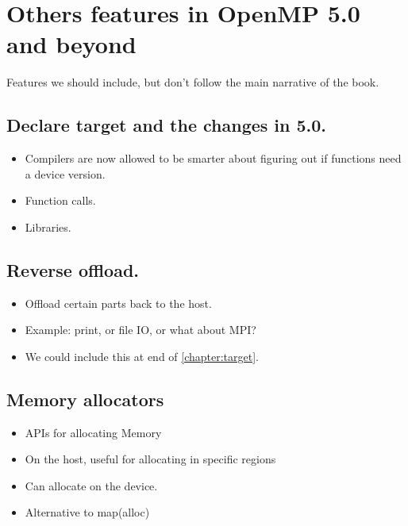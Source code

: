 
\chapter{Others features in OpenMP 5.0 and beyond}
\label{chapter:future}

Features we should include, but don't follow the main narrative of the book.

\section{Declare target and the changes in 5.0.}
\begin{itemize}
    \item Compilers are now allowed to be smarter about figuring out if functions need a device version.
    \item Function calls.
    \item Libraries.
\end{itemize}

\section{Reverse offload.}
\begin{itemize}
    \item Offload certain parts back to the host.
    \item Example: print, or file IO, or what about MPI?
    \item We could include this at end of \ref{chapter:target}.
\end{itemize}

\section{Memory allocators}
\begin{itemize}
    \item APIs for allocating Memory
    \item On the host, useful for allocating in specific regions
    \item Can allocate on the device.
    \item Alternative to map(alloc)
\end{itemize}


